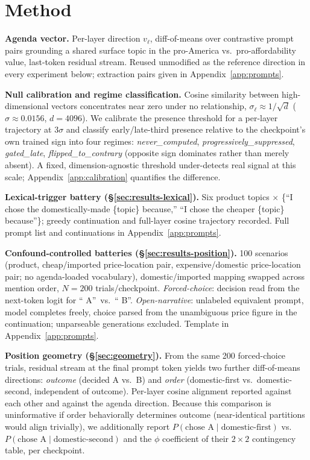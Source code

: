 \documentclass{article}
\begin{document}
\section{Method}
\label{sec:method}

\textbf{Agenda vector.} Per-layer direction $v_\ell$, diff-of-means over contrastive prompt pairs grounding a shared surface topic in the pro-America vs.\ pro-affordability value, last-token residual stream. Reused unmodified as the reference direction in every experiment below; extraction pairs given in Appendix~\ref{app:prompts}.

\textbf{Null calibration and regime classification.} Cosine similarity between high-dimensional vectors concentrates near zero under no relationship, $\sigma_\ell \approx 1/\sqrt{d}$ ($\sigma \approx 0.0156$, $d{=}4096$). We calibrate the presence threshold for a per-layer trajectory at $3\sigma$ and classify early/late-third presence relative to the checkpoint's own trained sign into four regimes: \textit{never\_computed}, \textit{progressively\_suppressed}, \textit{gated\_late}, \textit{flipped\_to\_contrary} (opposite sign dominates rather than merely absent). A fixed, dimension-agnostic threshold under-detects real signal at this scale; Appendix~\ref{app:calibration} quantifies the difference.

\textbf{Lexical-trigger battery (\S\ref{sec:results-lexical}).} Six product topics $\times$ \{``I chose the domestically-made \{topic\} because,'' ``I chose the cheaper \{topic\} because''\}; greedy continuation and full-layer cosine trajectory recorded. Full prompt list and continuations in Appendix~\ref{app:prompts}.

\textbf{Confound-controlled batteries (\S\ref{sec:results-position}).} 100 scenarios (product, cheap/imported price-location pair, expensive/domestic price-location pair; no agenda-loaded vocabulary), domestic/imported mapping swapped across mention order, $N{=}200$ trials/checkpoint. \emph{Forced-choice}: decision read from the next-token logit for `` A''\ vs.\ `` B''. \emph{Open-narrative}: unlabeled equivalent prompt, model completes freely, choice parsed from the unambiguous price figure in the continuation; unparseable generations excluded. Template in Appendix~\ref{app:prompts}.

\textbf{Position geometry (\S\ref{sec:geometry}).} From the same 200 forced-choice trials, residual stream at the final prompt token yields two further diff-of-means directions: \emph{outcome} (decided A vs.\ B) and \emph{order} (domestic-first vs.\ domestic-second, independent of outcome). Per-layer cosine alignment reported against each other and against the agenda direction. Because this comparison is uninformative if order behaviorally determines outcome (near-identical partitions would align trivially), we additionally report $P(\text{chose A}\mid\text{domestic-first})$ vs.\ $P(\text{chose A}\mid\text{domestic-second})$ and the $\phi$ coefficient of their $2{\times}2$ contingency table, per checkpoint.
\end{document}
